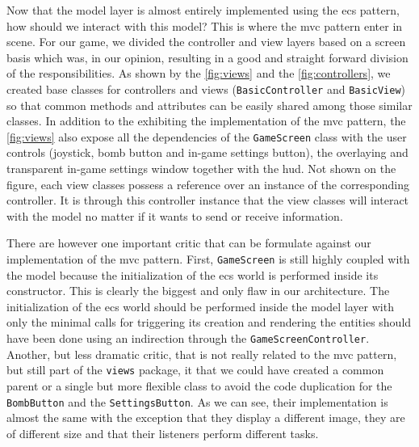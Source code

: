 Now that the model layer is almost entirely implemented using the \gls{ecs} pattern, how should we interact with this model? This is where the \gls{mvc} pattern enter in scene. For our game, we divided the controller and view layers based on a screen basis which was, in our opinion, resulting in a good and straight forward division of the responsibilities. As shown by the \autoref{fig:views} and the \autoref{fig:controllers}, we created base classes for controllers and views (\texttt{BasicController} and \texttt{BasicView}) so that common methods and attributes can be easily shared among those similar classes. In addition to the exhibiting the implementation of the \gls{mvc} pattern, the \autoref{fig:views} also expose all the dependencies of the \texttt{GameScreen} class with the user controls (joystick, bomb button and in-game settings button), the overlaying and transparent in-game settings window together with the \gls{hud}. Not shown on the figure, each view classes possess a reference over an instance of the corresponding controller. It is through this controller instance that the view classes will interact with the model no matter if it wants to send or receive information. \\


There are however one important critic that can be formulate against our implementation of the \gls{mvc} pattern. First, \texttt{GameScreen} is still highly coupled with the model because the initialization of the \gls{ecs} world is performed inside its constructor. This is clearly the biggest and only flaw in our architecture. The initialization of the \gls{ecs} world should be performed inside the model layer with only the minimal calls for triggering its creation and rendering the entities should have been done using an indirection through the \texttt{GameScreenController}. \\

Another, but less dramatic critic, that is not really related to the \gls{mvc} pattern, but still part of the \texttt{views} package, it that we could have created a common parent or a single but more flexible class to avoid the code duplication for the \texttt{BombButton} and the \texttt{SettingsButton}. As we can see, their implementation is almost the same with the exception that they display a different image, they are of different size and that their listeners perform different tasks.

